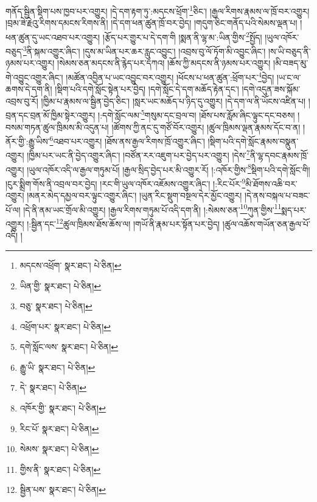 གནོད་སྦྱིན་སྡིག་པས་ཁྱབ་པར་འགྱུར། །དེ་དག་རྟག་ཏུ་:མདངས་ཕྲོག་\footnote{མདངས་འཕྲོག་  སྣར་ཐང་།  པེ་ཅིན། }ཅིང་། །རྒྱལ་རིགས་རྣམས་ལ་ཁྲོ་བར་འགྱུར། །བྲམ་ཟེ་རྗེའུ་རིགས་དམངས་རིགས་ནི། །དེ་དག་ཕན་ཚུན་ཁྲོ་བར་བྱེད། །གདུག་ཅིང་གནོད་པའི་སེམས་ལྡན་པ། །ཕན་ཚུན་དུ་ཡང་འཐབ་པར་འགྱུར། །རྩོད་པར་གྱུར་པ་དེ་དག་གི །སྨན་ནི་ལྷ་མ་:ཡིན་གྱིས་\footnote{ཡིན་གྱི་  སྣར་ཐང་།  པེ་ཅིན། }སྤྱོད། །ཡུལ་འཁོར་བཅུད་\footnote{བཅུ་  སྣར་ཐང་།  པེ་ཅིན། }ནི་སྐམ་འགྱུར་ཞིང་། །དུས་མ་ཡིན་པར་ཆར་རླུང་འབྱུང་། །འབྲས་བུ་ལོ་ཏོག་མི་འབྱུང་ཞིང་། །ས་ཡི་བཅུད་ནི་ཉམས་པར་འགྱུར། །སེམས་ཅན་མདངས་ནི་རྙེད་པར་དཀའ། །ཆོས་ཀྱི་མདངས་ནི་ཉམས་པར་འགྱུར། །མི་བཟད་མུ་གེ་འབྱུང་འགྱུར་ཞིང་། །མཚོན་འབྱིན་པ་ཡང་འབྱུང་བར་འགྱུར། །ཕོངས་པ་ཕན་ཚུན་:ཕྲོག་པར་\footnote{འཕྲོག་པར་  སྣར་ཐང་།  པེ་ཅིན། }བྱེད། །ཡ་ང་ལ་ཆགས་དེ་དག་ནི། །སྡིག་པའི་དགེ་སློང་སྟེན་པར་བྱེད། །དགེ་སློང་དེ་དག་མཆོད་རྟེན་དང་། །དགེ་འདུན་ཟས་སྐོམ་འབྲས་བུ་རོ། །ཁྱིམ་པ་རྣམས་ལ་སྦྱིན་བྱེད་ཅིང་། །སླར་ཡང་མཆོད་པ་ཉིད་དུ་འགྱུར། །དེ་དག་ལ་ནི་ཡོངས་འཛིན་པ། །བྲན་དང་བྲན་མོ་ཁྱིམ་སྟེར་འགྱུར། །:དགེ་སློང་ལམ་\footnote{དགེ་སློང་ལས་  སྣར་ཐང་།  པེ་ཅིན། }གསུམ་དང་བྲལ་བ། །ཐོས་པས་རློམ་ཞིང་ལྟུང་དང་བཅས། །བསམ་གཏན་ཚུལ་ཁྲིམས་མི་འདུན་པ། །ཚོགས་ཀྱི་ནང་དུ་གཙོ་བོར་འགྱུར། །ཚུལ་ཁྲིམས་ལྡན་རྣམས་དོང་བ་ན། །ནོར་གྱི་:རྒྱུ་ཡིས་\footnote{རྒྱུ་ཡི་  སྣར་ཐང་།  པེ་ཅིན། }འཐབ་པར་འགྱུར། །ཐོས་ནས་རྒྱལ་རིགས་ཁྲོ་འགྱུར་ཞིང་། །སྡིག་པའི་དགེ་སློང་རྣམས་བསྣུན་འགྱུར། །ཁྱིམ་པར་ཡང་ནི་བྱེད་འགྱུར་ཞིང་། །བཙོན་རར་འཇུག་པར་བྱེད་པར་འགྱུར། །དེས་\footnote{དེ་  སྣར་ཐང་།  པེ་ཅིན། }ནི་ལྷ་དབང་རྣམས་ཁྲོ་འགྱུར། །ཡུལ་འཁོར་འདི་ལ་རྒྱལ་གཏུམ་པོ། །རྒྱལ་སྲིད་བྱེད་པར་མི་འགྱུར་རོ། །:འཁོར་གྱིས་\footnote{འཁོར་གྱི་  སྣར་ཐང་།  པེ་ཅིན། }སྡིག་པའི་དགེ་སློང་གི། །ངུར་སྨྲིག་གོས་ནི་འབྲལ་བར་བྱེད། །རང་གི་ཡུལ་འཁོར་འཇོམས་འགྱུར་ཞིང་། །:རིང་པོར་\footnote{རིང་པོ་  སྣར་ཐང་།  པེ་ཅིན། }མི་ཐོགས་འཆི་བར་འགྱུར། །མནར་མེད་དམྱལ་བར་ལྟུང་འགྱུར་ཞིང་། །ཡུན་རིང་སྡུག་བསྔལ་དེར་མྱོང་འགྱུར། །དེ་ནས་བསྐལ་པ་བཟང་པོ་ལ། །དེ་ནི་ནམ་ཡང་གྲོལ་མི་འགྱུར། །རྒྱལ་རིགས་གཏུམ་པོ་འདི་དག་ནི། །:སེམས་ཅན་\footnote{སེམས་  སྣར་ཐང་།  པེ་ཅིན། }ཀུན་གྱིས་\footnote{གྱིས་ནི་  སྣར་ཐང་།  པེ་ཅིན། }སྨད་པར་འགྱུར། །:སྦྱིན་དང་\footnote{སྦྱིན་པས་  སྣར་ཐང་།  པེ་ཅིན། }ཚུལ་ཁྲིམས་ཐོས་ཆོས་ལ། །གཡོ་ནི་རྣམ་པར་སྟོན་པར་བྱེད། །ཚུལ་འཆོས་གཡོན་ཅན་རྒྱལ་པོ་འདི། །
